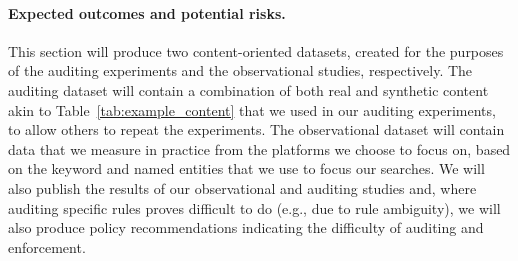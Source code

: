 \paragraph{Expected outcomes and potential risks.} This section will produce
two content-oriented datasets, created for the purposes of the auditing
experiments and the observational studies, respectively. The auditing dataset
will contain a combination of both real and synthetic content akin to
Table~\ref{tab:example_content} that we used in our auditing experiments, to allow
others to repeat the experiments. The observational dataset will contain data
that we measure in practice from the platforms we choose to focus on, based on the
keyword and named entities that we use to focus our searches. We will also
publish the results of our observational and auditing studies and, where
auditing specific rules proves difficult to do (e.g., due to rule ambiguity),
we will also produce policy recommendations indicating the difficulty of
auditing and enforcement. 

